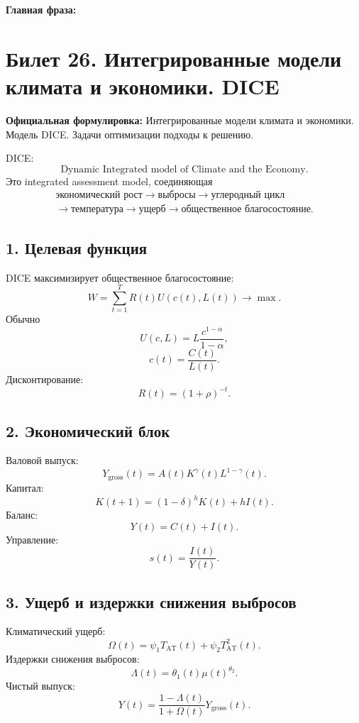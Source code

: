 \documentclass[12pt,a4paper]{article}
\begin{document}
\textbf{Главная фраза:}
\begin{center}
\end{center}

\section{Билет 26. Интегрированные модели климата и экономики. DICE}

\textbf{Официальная формулировка:} Интегрированные модели климата и экономики. Модель DICE. Задачи оптимизации подходы к решению.

DICE:
\[
\text{Dynamic Integrated model of Climate and the Economy}.
\]
Это integrated assessment model, соединяющая
\[
\begin{gathered}
\text{экономический рост}\to\text{выбросы}\to\text{углеродный цикл}\\
\to\text{температура}\to\text{ущерб}\to\text{общественное благосостояние}.
\end{gathered}
\]

\subsection*{1. Целевая функция}
DICE максимизирует общественное благосостояние:
\[
W=\sum_{t=1}^{T}R(t)U(c(t),L(t))\to\max.
\]
Обычно
\[
U(c,L)=L\frac{c^{1-\alpha}}{1-\alpha},
\]
\[
c(t)=\frac{C(t)}{L(t)}.
\]
Дисконтирование:
\[
R(t)=(1+\rho)^{-t}.
\]

\subsection*{2. Экономический блок}
Валовой выпуск:
\[
Y_{\mathrm{gross}}(t)=A(t)K^\gamma(t)L^{1-\gamma}(t).
\]
Капитал:
\[
K(t+1)=(1-\delta)^hK(t)+hI(t).
\]
Баланс:
\[
Y(t)=C(t)+I(t).
\]
Управление:
\[
s(t)=\frac{I(t)}{Y(t)}.
\]

\subsection*{3. Ущерб и издержки снижения выбросов}
Климатический ущерб:
\[
\Omega(t)=\psi_1T_{\mathrm{AT}}(t)+\psi_2T_{\mathrm{AT}}^2(t).
\]
Издержки снижения выбросов:
\[
\Lambda(t)=\theta_1(t)\mu(t)^{\theta_2}.
\]
Чистый выпуск:
\[
Y(t)=\frac{1-\Lambda(t)}{1+\Omega(t)}Y_{\mathrm{gross}}(t).
\]
\end{document}
